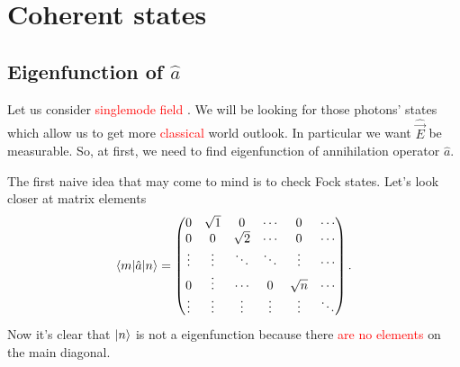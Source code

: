 \section{Coherent states}

\subsection{Eigenfunction of {$\hat{a}$}}

Let us consider {\textcolor{red}{ singlemode field }}. 
 We will be looking for those photons' states which allow us to get more {\textcolor{red} {classical}} world outlook. In particular we want $\hat{\vec{E}}$ be measurable. So, at first, we need to find eigenfunction of annihilation operator $\hat{a}$.

The first naive idea that may come to mind is to check Fock states. Let's look closer at matrix elements
\begin{equation}
	\langle m\rvert \hat{a} \lvert n\rangle =
	\begin{pmatrix}
		0 & \sqrt{1} & 0 &  \cdots  & 0 & \cdots \\
		0 & 0 & \sqrt{2} &  \cdots & 0 & \cdots \\
		\vdots & \vdots & \ddots & \ddots & \vdots  & \cdots \\
		0 & \vdots & \cdots & 0 & \sqrt{n} & \cdots \\
		\vdots & \vdots & \vdots & \vdots & \vdots & \ddots\\
	\end{pmatrix}.
\end{equation}
Now it's clear that {\textcolor{red}{ $\lvert n\rangle$ }}is not a eigenfunction because there {\textcolor{red} {are no elements }}on the main diagonal.


